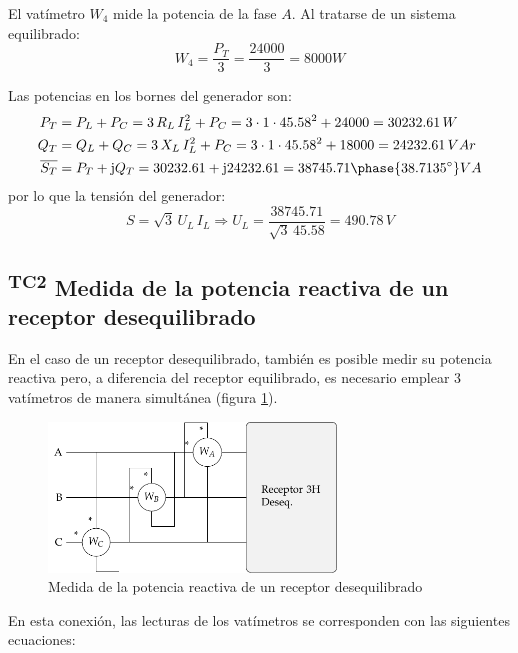 \begin{example}
El vatímetro $W_4$ mide la potencia de la fase $A$. Al tratarse de un sistema equilibrado:
\begin{equation*}
    W_4=\dfrac{P_T}{3}=\dfrac{24000}{3}=8000W
\end{equation*}

Las potencias en los bornes del generador son:
\begin{align*}
    P_T&=P_L+P_C=3\,R_L\,I_L^2+P_C=3\cdot 1\cdot 45.58^2+24000=30232.61\,W\\
    Q_T&=Q_L+Q_C=3\,X_L\,I_L^2+P_C=3\cdot 1\cdot 45.58^2+18000=24232.61\,VAr\\
    \overline{S_T}&=P_T+\mathrm{j}Q_T=30232.61+\mathrm{j}24232.61=38745.71\phase{38.7135^\circ} VA
\end{align*}
por lo que la tensión del generador:
\begin{equation*}
    S=\sqrt{3}\,U_L\, I_L\Rightarrow U_L=\dfrac{38745.71}{\sqrt{3}\,45.58}=490.78\,V
\end{equation*}
\end{example}

\subsection{\textsuperscript{TC2} Medida de la potencia reactiva de un
  receptor desequilibrado}
\label{sec:medida-potencia-des}

En el caso de un receptor desequilibrado, también es posible medir su
potencia reactiva pero, a diferencia del receptor equilibrado, es
necesario emplear 3 vatímetros de manera simultánea (figura
\ref{fig:medida-potencia-des}).

\begin{figure}[H]
  \centering
  \includegraphics[height=4cm]{../figs/Reactiva_3H_deseq.pdf}
  \caption{Medida de la potencia reactiva de un receptor
    desequilibrado}
  \label{fig:medida-potencia-des}
\end{figure}

En esta conexión, las lecturas de los vatímetros se corresponden con
las siguientes ecuaciones:

